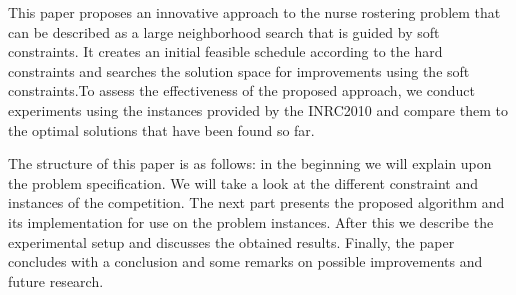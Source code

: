 \documentclass{article}
\begin{document}
This paper proposes an innovative approach to the nurse rostering problem that can be described as a large neighborhood search that is guided by soft constraints. It creates an initial feasible schedule according to the hard constraints and searches the solution space for improvements using the soft constraints.To assess the effectiveness of the proposed approach, we conduct experiments using the instances provided by the INRC2010 and compare them to the optimal solutions that have been found so far. 

The structure of this paper is as follows: in the beginning we will explain upon the problem specification. We will take a look at the different constraint and instances of the competition. The next part presents the proposed algorithm and its implementation for use on the problem instances. After this we describe the experimental setup and discusses the obtained results. Finally, the paper concludes with a conclusion and some remarks on possible improvements and future research.
\end{document}

